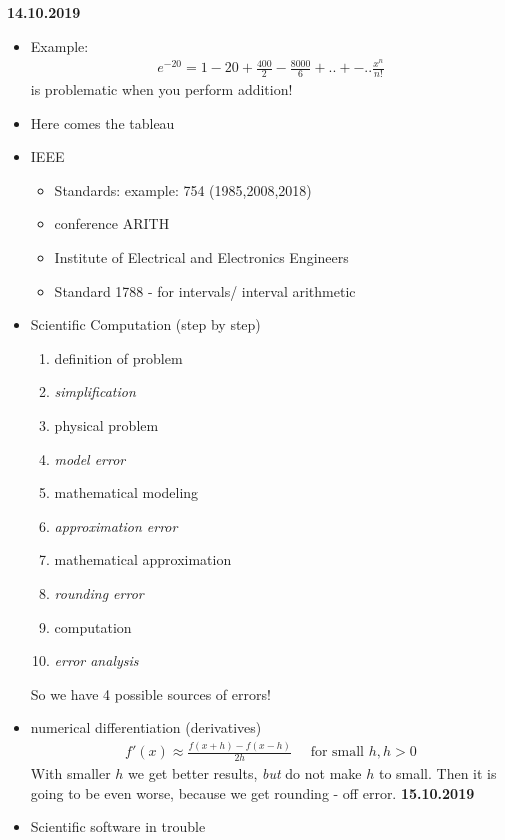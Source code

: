 \textbf{14.10.2019}
\begin{itemize}
	\item Example:
	\begin{align*}
		e^{-20}=1-20+\frac{400}{2}-\frac{8000}{6}+..+-.. \frac{x^n}{n!}
	\end{align*}
	is problematic when you perform addition!
	\item Here comes the tableau
	\item IEEE 
	\begin{itemize}
		\item Standards: example: 754 (1985,2008,2018)
		\item conference ARITH
		\item Institute of Electrical and Electronics Engineers
		\item Standard 1788 - for intervals/ interval arithmetic
	\end{itemize}
	\item Scientific Computation (step by step) %
	\begin{enumerate}
		\item definition of problem
		\item \emph{simplification}
		\item physical problem
		\item \emph{model error}
		\item mathematical modeling
		\item \emph{approximation error}
		\item mathematical approximation
		\item \emph{rounding error}
		\item computation
		\item \emph{error analysis}
	\end{enumerate}
	So we have 4 possible sources of errors!
	\item numerical differentiation (derivatives)
	\begin{align*}
		f'(x)\approx \frac{f(x+h)-f(x-h)}{2h} \quad \text{ for small $h$}, h > 0
	\end{align*}
	With smaller $h$ we get better results, \emph{but} do not make $h$ to small. Then it is going to be even worse, because we get rounding - off error.
	\bigskip
	\textbf{15.10.2019}\\
	\item Scientific software in trouble\\
	\begin{tabularx}{\textwidth}{|X|X|X|}

\end{tabularx}
\end{itemize}
